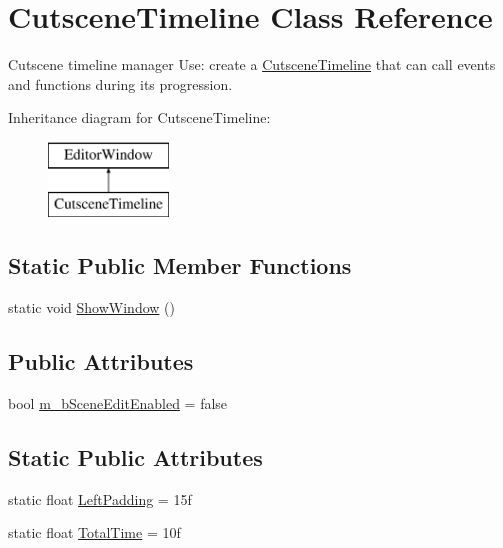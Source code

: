 \hypertarget{class_cutscene_timeline}{}\section{Cutscene\+Timeline Class Reference}
\label{class_cutscene_timeline}


Cutscene timeline manager Use\+: create a \mbox{\hyperlink{class_cutscene_timeline}{Cutscene\+Timeline}} that can call events and functions during its progression.  


Inheritance diagram for Cutscene\+Timeline\+:\begin{figure}[H]
\begin{center}
\leavevmode
\includegraphics[height=2.000000cm]{class_cutscene_timeline}
\end{center}
\end{figure}
\subsection*{Static Public Member Functions}
\begin{DoxyCompactItemize}
\item 
static void \mbox{\hyperlink{class_cutscene_timeline_ab05d4b8d3e309ca03a33ef070135b69d}{Show\+Window}} ()
\end{DoxyCompactItemize}
\subsection*{Public Attributes}
\begin{DoxyCompactItemize}
\item 
bool \mbox{\hyperlink{class_cutscene_timeline_a0ddcb630d2d5dcfea4d5e3d44dd7cce6}{m\+\_\+b\+Scene\+Edit\+Enabled}} = false
\end{DoxyCompactItemize}
\subsection*{Static Public Attributes}
\begin{DoxyCompactItemize}
\item 
static float \mbox{\hyperlink{class_cutscene_timeline_a580e21f1555fdd6913619ca2d3fd0308}{Left\+Padding}} = 15f
\item 
static float \mbox{\hyperlink{class_cutscene_timeline_a1ba003967086092a98e24bdfb58dc645}{Total\+Time}} = 10f
\end{DoxyCompactItemize}


